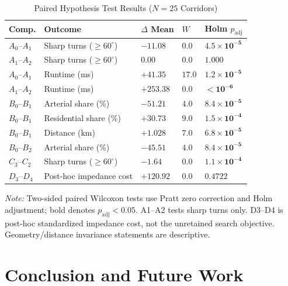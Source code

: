 \documentclass[11pt,conference]{IEEEtran}
\begin{document}
\begin{table}[!t]
\caption{Paired Hypothesis Test Results ($N=25$ Corridors)}
\label{tab:statistical_results}
\centering
\footnotesize
\setlength{\tabcolsep}{1.5pt}
\renewcommand{\arraystretch}{1.08}
\begin{tabular}{@{}p{0.52in}p{0.90in}p{0.52in}p{0.25in}p{0.75in}@{}}
\hline
\textbf{Comp.} & \textbf{Outcome} & \textbf{$\Delta$ Mean} &
\textbf{$W$} & \textbf{Holm $p_{\mathrm{adj}}$} \\
\hline
$A_0$--$A_1$ & Sharp turns ($\ge60^\circ$) & $-11.08$ & $0.0$ & $\mathbf{4.5 \times 10^{-5}}$ \\
$A_1$--$A_2$ & Sharp turns ($\ge60^\circ$) & $0.00$ & $0.0$ & $1.000$ \\
$A_0$--$A_1$ & Runtime (ms) & $+41.35$ & $17.0$ & $\mathbf{1.2 \times 10^{-5}}$ \\
$A_1$--$A_2$ & Runtime (ms) & $+253.38$ & $0.0$ & $\mathbf{< 10^{-6}}$ \\
$B_0$--$B_1$ & Arterial share (\%) & $-51.21$ & $4.0$ & $\mathbf{8.4 \times 10^{-5}}$ \\
$B_0$--$B_1$ & Residential share (\%) & $+30.73$ & $9.0$ & $\mathbf{1.5 \times 10^{-4}}$ \\
$B_0$--$B_1$ & Distance (km) & $+1.028$ & $7.0$ & $\mathbf{6.8 \times 10^{-5}}$ \\
$B_0$--$B_2$ & Arterial share (\%) & $-45.51$ & $4.0$ & $\mathbf{8.4 \times 10^{-5}}$ \\
$C_3$--$C_2$ & Sharp turns ($\ge60^\circ$) & $-1.64$ & $0.0$ & $\mathbf{1.1 \times 10^{-4}}$ \\
$D_3$--$D_4$ & Post-hoc impedance cost & $+120.92$ & $0.0$ & $0.4722$ \\
\hline
\end{tabular}
\vspace{2pt}
\begin{minipage}{\columnwidth}
\scriptsize
\textit{Note:} Two-sided paired Wilcoxon tests use Pratt zero correction and Holm adjustment; bold denotes $p_{\mathrm{adj}}<0.05$. A1--A2 tests sharp turns only. D3--D4 is post-hoc standardized impedance cost, not the unretained search objective. Geometry/distance invariance statements are descriptive.
\end{minipage}
\end{table}

\section{Conclusion and Future Work}
\end{document}
